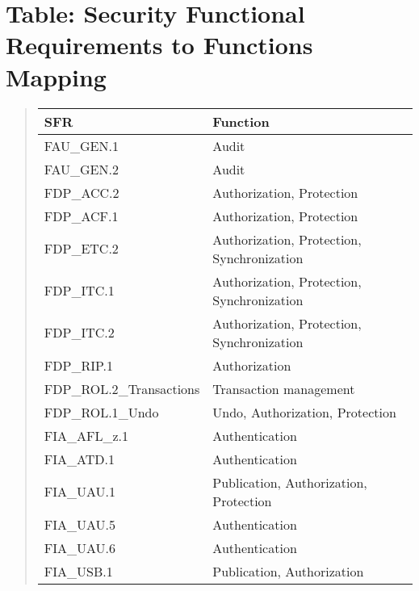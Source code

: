 \documentclass[12pt,english]{scrbook}
\begin{document}
\section{Table: Security Functional Requirements to Functions Mapping}
\begin{quote}

\begin{longtable}[c]{|l|l|}
\hline
\textbf{
SFR
} & \textbf{
Function
} \\
\hline
\endhead

FAU{\_}GEN.1
 & 
Audit
 \\
\hline

FAU{\_}GEN.2
 & 
Audit
 \\
\hline

FDP{\_}ACC.2
 & 
Authorization, Protection
 \\
\hline

FDP{\_}ACF.1
 & 
Authorization, Protection
 \\
\hline

FDP{\_}ETC.2
 & 
Authorization, Protection, Synchronization
 \\
\hline

FDP{\_}ITC.1
 & 
Authorization, Protection, Synchronization
 \\
\hline

FDP{\_}ITC.2
 & 
Authorization, Protection, Synchronization
 \\
\hline

FDP{\_}RIP.1
 & 
Authorization
 \\
\hline

FDP{\_}ROL.2{\_}Transactions
 & 
Transaction management
 \\
\hline

FDP{\_}ROL.1{\_}Undo
 & 
Undo, Authorization, Protection
 \\
\hline

FIA{\_}AFL{\_}z.1
 & 
Authentication
 \\
\hline

FIA{\_}ATD.1
 & 
Authentication
 \\
\hline

FIA{\_}UAU.1
 & 
Publication, Authorization, Protection
 \\
\hline

FIA{\_}UAU.5
 & 
Authentication
 \\
\hline

FIA{\_}UAU.6
 & 
Authentication
 \\
\hline

FIA{\_}USB.1
 & 
Publication, Authorization
 \\
\hline


\end{longtable}
\end{quote}
\end{document}
